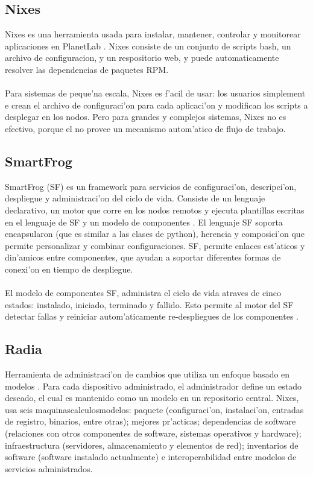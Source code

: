 \subsection{Nixes}
Nixes es una herramienta usada para instalar, mantener, controlar y monitorear aplicaciones en PlanetLab \cite{1}. Nixes consiste de un conjunto de scripts bash, un archivo de configuracion, y un respositorio web, y puede automaticamente resolver las dependencias de paquetes RPM.\\
\\
Para sistemas de peque'na escala, Nixes es f'acil de usar: los usuarios simplement e crean el archivo de configuraci'on para cada aplicaci'on y modifican los scripts a desplegar en los nodos. Pero para grandes y complejos sistemas, Nixes no es efectivo, porque el no provee un mecanismo autom'atico de flujo de trabajo.

\subsection{SmartFrog}
SmartFrog (SF) es un framework para servicios de configuraci'on, descripci'on, despliegue y administraci'on del ciclo de vida. Consiste de un lenguaje declarativo, un motor que corre en los nodos remotos y ejecuta plantillas escritas en el lenguaje de SF y un modelo de componentes \cite{3}. El lenguaje SF soporta encapsularon (que es similar a las clases de python), herencia y composici'on que permite personalizar y combinar configuraciones. SF, permite enlaces est'aticos y din'amicos entre componentes, que ayudan a soportar diferentes formas de conexi'on en tiempo de despliegue.\\
\\
El modelo de componentes SF, administra el ciclo de vida atraves de cinco estados: instalado, iniciado, terminado y fallido. Esto permite al motor del SF detectar fallas y reiniciar autom'aticamente re-despliegues de los componentes \cite{11}.

\subsection{Radia}
Herramienta de administraci'on de cambios que utiliza un enfoque basado en modelos \cite{5}. Para cada dispositivo administrado, el administrador define un estado deseado, el cual es mantenido como un modelo en un repositorio central. Nixes, usa seis maquinascalculosmodelos: paquete (configuraci'on, instalaci'on, entradas de registro, binarios, entre otras); mejores pr'acticas; dependencias de software (relaciones con otros componentes de software, sistemas operativos y hardware); infraestructura (servidores, almacenamiento y elementos de red); inventarios de software (software instalado actualmente) e interoperabilidad entre modelos de servicios administrados. 

